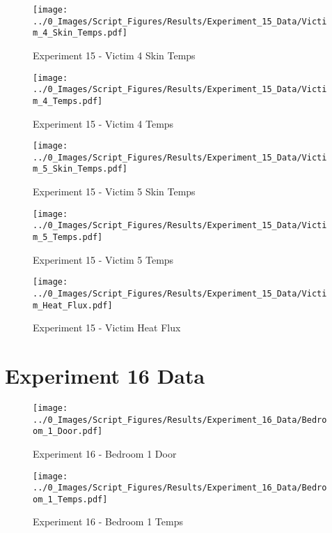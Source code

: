 	\begin{figure}[H]
		\centering
		\texttt{[image: ../0\_Images/Script\_Figures/Results/Experiment\_15\_Data/Victim\_4\_Skin\_Temps.pdf]}
		\caption[]{Experiment 15 - Victim 4 Skin Temps}
	\end{figure}
 
	\clearpage

	\begin{figure}[H]
		\centering
		\texttt{[image: ../0\_Images/Script\_Figures/Results/Experiment\_15\_Data/Victim\_4\_Temps.pdf]}
		\caption[]{Experiment 15 - Victim 4 Temps}
	\end{figure}
 

	\begin{figure}[H]
		\centering
		\texttt{[image: ../0\_Images/Script\_Figures/Results/Experiment\_15\_Data/Victim\_5\_Skin\_Temps.pdf]}
		\caption[]{Experiment 15 - Victim 5 Skin Temps}
	\end{figure}
 
	\clearpage

	\begin{figure}[H]
		\centering
		\texttt{[image: ../0\_Images/Script\_Figures/Results/Experiment\_15\_Data/Victim\_5\_Temps.pdf]}
		\caption[]{Experiment 15 - Victim 5 Temps}
	\end{figure}
 

	\begin{figure}[H]
		\centering
		\texttt{[image: ../0\_Images/Script\_Figures/Results/Experiment\_15\_Data/Victim\_Heat\_Flux.pdf]}
		\caption[]{Experiment 15 - Victim Heat Flux}
	\end{figure}
 
	\clearpage

\clearpage		\large
\section{Experiment 16 Data} \label{App:Exp16Results} 

	\begin{figure}[H]
		\centering
		\texttt{[image: ../0\_Images/Script\_Figures/Results/Experiment\_16\_Data/Bedroom\_1\_Door.pdf]}
		\caption[]{Experiment 16 - Bedroom 1 Door}
	\end{figure}
 

	\begin{figure}[H]
		\centering
		\texttt{[image: ../0\_Images/Script\_Figures/Results/Experiment\_16\_Data/Bedroom\_1\_Temps.pdf]}
		\caption[]{Experiment 16 - Bedroom 1 Temps}
	\end{figure}
 
